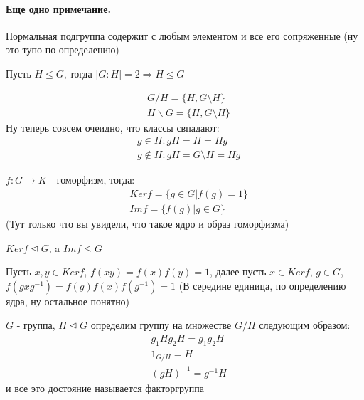 \paragraph{Еще одно примечание.} Нормальная подгруппа содержит с любым элементом и все его сопряженные (ну это тупо по определению)

\begin{Th}
Пусть $H \le G$, тогда $\left|G : H\right| = 2 \Rightarrow H \trianglelefteq G$
\end{Th}

\begin{Proof}
\[
	\begin{split}
		& G / H = \{H, G \setminus H\} \\
		& H \backslash G = \{H, G \setminus H\}
	\end{split}
\]
Ну теперь совсем очеидно, что классы свпадают:
\[
	\begin{split}
		& g \in H: gH = H = Hg\\
		& g \not\in H : gH = G \setminus H = Hg
	\end{split}
\]
\end{Proof}

\begin{Def}
$f : G \rightarrow K$ - гоморфизм, тогда:
\[
	\begin{split}
	& Ker f = \{g \in G | f\left(g \right) = 1\} \\
	& Im f = \{f\left( g \right) | g \in G \}
	\end{split}
\]
(Тут только что вы увидели, что такое ядро и образ гоморфизма)
\end{Def}

\begin{Th}
$Ker f \trianglelefteq G$, a $Im f \le G$
\end{Th}

\begin{Proof}
Пусть $x,y \in Ker f$, $f\left(xy\right) = f\left(x\right) f\left(y\right) = 1$, далее пусть $x \in Ker f$, $g \in G$, $f\left(gxg^{-1}\right) = f\left(g\right) f\left(x\right) f\left(g^{-1}\right) = 1$ (В середине единица, по определению ядра, ну остальное понятно)
\end{Proof}

\begin{Def}
$G$ - группа, $H \trianglelefteq G$ определим группу на множестве $G / H$ следующим образом:
\[
	\begin{split}
		& g_1 H g_2 H = g_1 g_2 H \\
		& 1_{G/H} = H \\
		& {\left(gH\right)}^{-1} = g^{-1}H
	\end{split}
\]
и все это достояние называется факторгруппа
\end{Def}

